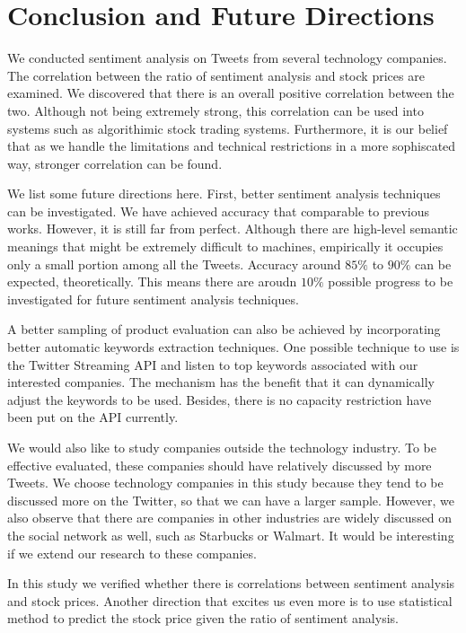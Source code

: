 \documentclass[12pt]{article}
\begin{document}
\section{Conclusion and Future Directions}

We conducted sentiment analysis on Tweets from several technology companies. The correlation between the ratio of sentiment analysis and stock prices are examined. We discovered that there is an overall positive correlation between the two. Although not being extremely strong, this correlation can be used into systems such as algorithimic stock trading systems. Furthermore, it is our belief that as we handle the limitations and technical restrictions in a more sophiscated way, stronger correlation can be found.

We list some future directions here. First, better sentiment analysis techniques can be investigated. We have achieved accuracy that comparable to previous works. However, it is still far from perfect. Although there are high-level semantic meanings that might be extremely difficult to machines, empirically it occupies only a small portion among all the Tweets. Accuracy around $85\%$ to $90\%$ can be expected, theoretically. This means there are aroudn $10\%$ possible progress to be investigated for future sentiment analysis techniques.

A better sampling of product evaluation can also be achieved by incorporating better automatic keywords extraction techniques. One possible technique to use is the Twitter Streaming API \cite{TwtStrAPI} and listen to top keywords associated with our interested companies. The mechanism has the benefit that it can dynamically adjust the keywords to be used. Besides, there is no capacity restriction have been put on the API currently.

We would also like to study companies outside the technology industry. To be effective evaluated, these companies should have relatively discussed by more Tweets. We choose technology companies in this study because they tend to be discussed more on the Twitter, so that we can have a larger sample. However, we also observe that there are companies in other industries are widely discussed on the social network as well, such as Starbucks or Walmart. It would be interesting if we extend our research to these companies.

In this study we verified whether there is correlations between sentiment analysis and stock prices. Another direction that excites us even more is to use statistical method to predict the stock price given the ratio of sentiment analysis.



\end{document}
